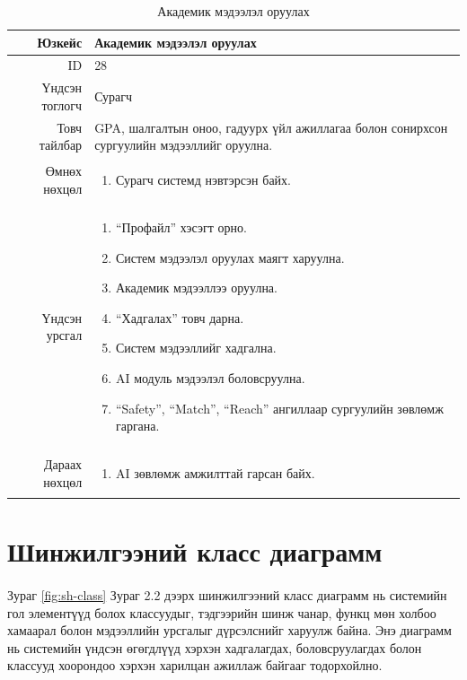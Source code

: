 \begin{longtable}{|r|p{11cm}|}
\caption{Академик мэдээлэл оруулах}
\label{table:usecase28}\\ \hline
Юзкейс & Академик мэдээлэл оруулах \\ \hline
ID & 28 \\ \hline
Үндсэн тоглогч & Сурагч \\ \hline
Товч тайлбар & GPA, шалгалтын оноо,
гадуурх үйл ажиллагаа болон сонирхсон
сургуулийн мэдээллийг оруулна. \\ \hline
Өмнөх нөхцөл &
\begin{enumerate}[nosep]
\item Сурагч системд нэвтэрсэн байх.
\end{enumerate} \\ \hline
Үндсэн урсгал &
\begin{enumerate}[nosep]
\item ``Профайл'' хэсэгт орно.
\item Систем мэдээлэл оруулах маягт харуулна.
\item Академик мэдээллээ оруулна.
\item ``Хадгалах'' товч дарна.
\item Систем мэдээллийг хадгална.
\item AI модуль мэдээлэл боловсруулна.
\item ``Safety'', ``Match'', ``Reach''
ангиллаар сургуулийн зөвлөмж гаргана.
\end{enumerate} \\ \hline
Дараах нөхцөл &
\begin{enumerate}[nosep]
\item AI зөвлөмж амжилттай гарсан байх.
\end{enumerate} \\ \hline
\end{longtable}
\section{Шинжилгээний класс диаграмм}
\paragraph{} Зураг \ref{fig:sh-class} Зураг 2.2 дээрх шинжилгээний класс диаграмм нь системийн гол элементүүд болох
классуудыг, тэдгээрийн шинж чанар, функц мөн холбоо хамаарал болон мэдээллийн
урсгалыг дүрсэлснийг харуулж байна. Энэ диаграмм нь системийн үндсэн өгөгдлүүд
хэрхэн хадгалагдах, боловсруулагдах болон классууд хоорондоо хэрхэн харилцан
ажиллаж байгааг тодорхойлно.

